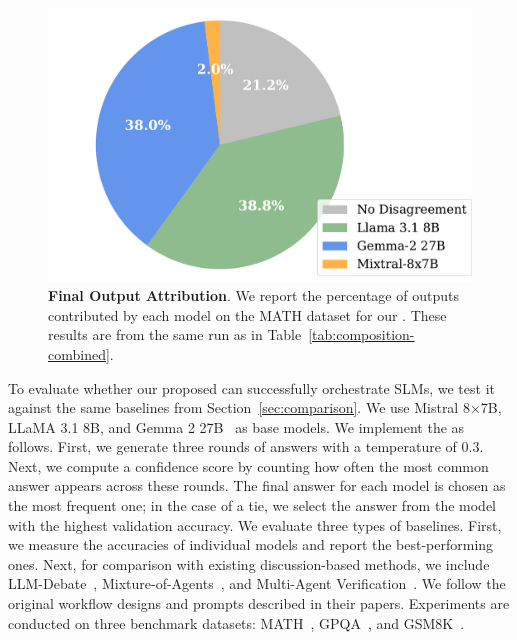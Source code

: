\begin{figure}
    \centering
    \vspace{-20pt}
    \includegraphics[width=.85\linewidth]{Figures/math_distribution_pie.pdf}
    \caption{\textbf{Final Output Attribution}. We report the percentage of outputs contributed by each model on the MATH dataset for our \NAME{}. These results are from the same run as in Table~\ref{tab:composition-combined}.}
    \label{fig:output_percentage_math}
    \vspace{-5pt}
\end{figure}

To evaluate whether our proposed \NAME{} can successfully orchestrate SLMs, we test it against the same baselines from Section~\ref{sec:comparison}.  We use Mistral 8$\times$7B, LLaMA 3.1 8B, and Gemma 2 27B~\citep{gemmateam2024gemma2improvingopen} as base models. We implement the \NAME{} as follows. First, we generate three rounds of answers with a temperature of 0.3. Next, we compute a confidence score by counting how often the most common answer appears across these rounds. The final answer for each model is chosen as the most frequent one; in the case of a tie, we select the answer from the model with the highest validation accuracy. We evaluate three types of baselines. First, we measure the accuracies of individual models and report the best-performing ones. Next, for comparison with existing discussion-based methods, we include LLM-Debate~\citep{du2023improvingfactualityreasoninglanguage}, Mixture-of-Agents~\citep{wang2024mixtureofagentsenhanceslargelanguage}, and Multi-Agent Verification~\citep{lifshitz2025multiagentverificationscalingtesttime}. We follow the original workflow designs and prompts described in their papers. Experiments are conducted on three benchmark datasets: MATH~\citep{hendrycks2021measuringmathematicalproblemsolving}, GPQA~\citep{rein2023gpqagraduatelevelgoogleproofqa}, and GSM8K~\citep{cobbe2021trainingverifierssolvemath}. 





